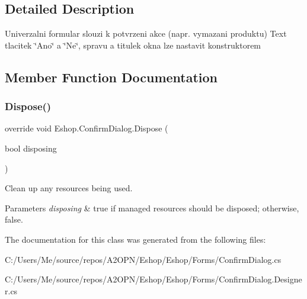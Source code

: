 \subsection{Detailed Description}
Univerzalni formular slouzi k potvrzeni akce (napr. vymazani produktu) Text tlacitek \char`\"{}\+Ano\char`\"{} a \char`\"{}\+Ne\char`\"{}, spravu a titulek okna lze nastavit konstruktorem 



\subsection{Member Function Documentation}
\mbox{\label{class_eshop_1_1_confirm_dialog_a5384ad9f77d45bb6d1d37af050c64c3d}} 
\subsubsection{\texorpdfstring{Dispose()}{Dispose()}}
{\footnotesize\ttfamily override void Eshop.\+Confirm\+Dialog.\+Dispose (\begin{DoxyParamCaption}\item[{bool}]{disposing }\end{DoxyParamCaption})\hspace{0.3cm}{\ttfamily [protected]}}



Clean up any resources being used. 


\begin{DoxyParams}{Parameters}
{\em disposing} & true if managed resources should be disposed; otherwise, false.\\
\hline
\end{DoxyParams}


The documentation for this class was generated from the following files\+:\begin{DoxyCompactItemize}
\item 
C\+:/\+Users/\+Me/source/repos/\+A2\+O\+P\+N/\+Eshop/\+Eshop/\+Forms/Confirm\+Dialog.\+cs\item 
C\+:/\+Users/\+Me/source/repos/\+A2\+O\+P\+N/\+Eshop/\+Eshop/\+Forms/Confirm\+Dialog.\+Designer.\+cs\end{DoxyCompactItemize}
